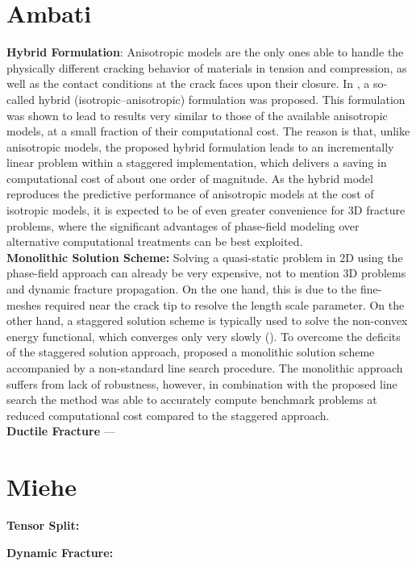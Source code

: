 \section{Ambati}
{\bf Hybrid Formulation}: Anisotropic models are the only ones able to handle the physically different cracking behavior of materials in tension and compression, as well as the contact conditions at the crack faces upon their closure. In \cite{ambati2015review}, a so-called hybrid (isotropic–anisotropic) formulation was proposed. This formulation was shown to lead to results very similar to those of the available anisotropic models, at a small fraction of their computational cost. The reason is that, unlike anisotropic models, the proposed hybrid formulation leads to an incrementally linear problem within a staggered implementation, which delivers a saving in computational cost of about one order of magnitude. As the hybrid model reproduces the predictive performance of anisotropic models at the cost of isotropic models, it is expected to be of even greater convenience for 3D fracture problems, where the significant advantages of phase-field modeling over alternative computational treatments can be best exploited.
\\

{\bf Monolithic Solution Scheme:}
Solving a quasi-static problem in 2D using the phase-field approach can already be very expensive, not to mention 3D problems and dynamic fracture propagation. On the one hand, this is due to the fine-meshes required near the crack tip to resolve the length scale parameter. On the other hand, a staggered solution scheme is typically used to solve the non-convex energy functional, which converges only very slowly (\cite{gerasimov2016line}). To overcome the deficits of the staggered solution approach, \cite{gerasimov2016line} proposed a monolithic solution scheme accompanied by a non-standard line search procedure. The monolithic approach suffers from lack of robustness, however, in combination with the proposed line search the method was able to accurately compute benchmark problems at reduced computational cost compared to the staggered approach. 
\\

{\bf Ductile Fracture}
--- \cite{ambati2015phase}

\section{Miehe}
{\bf Tensor Split: }

{\bf Dynamic Fracture:}

